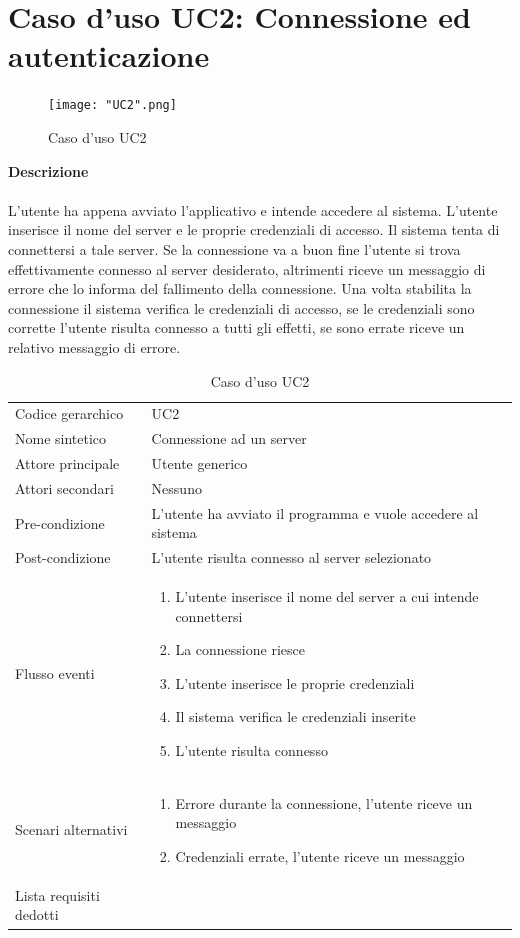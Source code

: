 \documentclass[a4paper]{report}
\begin{document}
	\section{Caso d'uso UC2: Connessione ed autenticazione}
		 	\begin{figure}[H]
				\centering
				\texttt{[image: "UC2".png]}
				\caption{Caso d'uso UC2}
			\end{figure}
		 \textbf{Descrizione} \\ \\
		 L'utente ha appena avviato l'applicativo e intende accedere al sistema. L'utente 
		 inserisce il nome del server e le proprie credenziali di accesso. Il sistema tenta di connettersi a tale
		 server. Se la connessione va a buon fine l'utente si trova effettivamente connesso al server
		 desiderato, altrimenti riceve un messaggio di errore che lo informa del fallimento della connessione.
		 Una volta stabilita la connessione il sistema verifica le credenziali di accesso, se le credenziali sono
		 corrette l'utente risulta connesso a tutti gli effetti, se sono errate riceve un relativo messaggio di 
		 errore.
			\begin{table}[H]
			\begin{tabularx}{\textwidth}{X | X}\toprule
				\rowcolor{orange!65}Codice gerarchico & UC2 \\
				Nome sintetico & Connessione ad un server \\
				\rowcolor{orange!65}Attore principale & Utente generico\\
				Attori secondari & Nessuno \\
				\rowcolor{orange!65}Pre-condizione & L'utente ha avviato il programma e vuole accedere al
				 sistema\\
				Post-condizione & L'utente risulta connesso al server selezionato \\
				\rowcolor{orange!65}Flusso eventi & \begin{enumerate}
				\item L'utente inserisce il nome del server a cui intende connettersi
				\item La connessione riesce
				\item L'utente inserisce le proprie credenziali
				\item Il sistema verifica le credenziali inserite
				\item L'utente risulta connesso
				\end{enumerate} \\
				Scenari alternativi & \begin{enumerate}
				\item Errore durante la connessione, l'utente riceve un messaggio
				\item Credenziali errate, l'utente riceve un messaggio
				\end{enumerate} \\
				\rowcolor{orange!65}Lista requisiti dedotti & \\
				\bottomrule
			\end{tabularx}
			\caption{Caso d'uso UC2}
		 \end{table}
\end{document}
